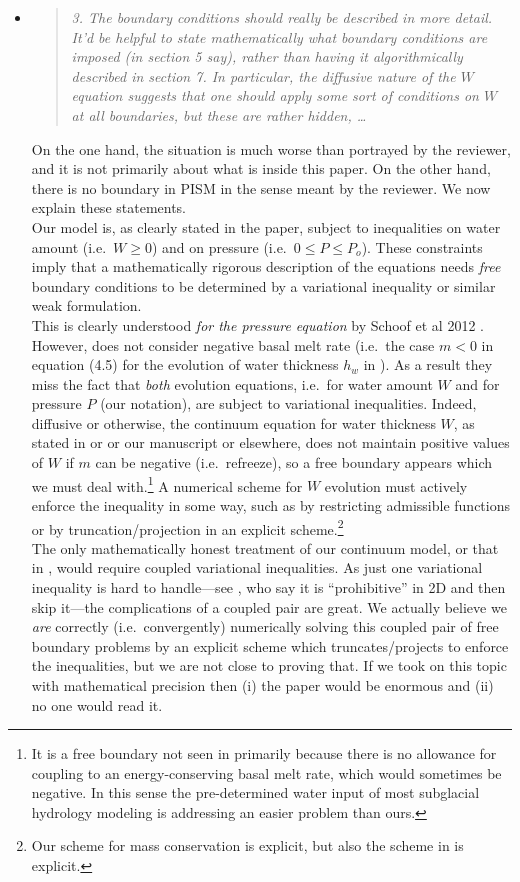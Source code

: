 \documentclass[11pt,reqno]{amsart}
\newcommand{\reply}[2]{
\medskip\medskip
\item  \begin{quote}
\emph{#1}
\end{quote}

\medskip
\noindent #2}
\begin{document}
\begin{itemize}
\reply{3. The boundary conditions should really be described in more detail.  It'd be helpful to state mathematically what boundary conditions are imposed (in section 5 say), rather than having it algorithmically described in section 7.  In particular, the diffusive nature of the $W$ equation suggests that one should apply some sort of conditions on $W$ at all boundaries, but these are rather hidden, \dots}
{On the one hand, the situation is much worse than portrayed by the reviewer, and it is not primarily about what is inside this paper.  On the other hand, there is no boundary in PISM in the sense meant by the reviewer.  We now explain these statements.\\
\indent Our model is, as clearly stated in the paper, subject to inequalities on water amount (i.e.~$W\ge 0$) and on pressure (i.e.~$0\le P \le P_o$).  These constraints imply that a mathematically rigorous description of the equations needs \emph{free} boundary conditions to be determined by a variational inequality or similar weak formulation.\\
\indent This is clearly understood \emph{for the pressure equation} by Schoof et al 2012 \cite{Schoofetal2012}.  However, \cite{Schoofetal2012} does not consider negative basal melt rate (i.e.~the case $m<0$ in equation (4.5) for the evolution of water thickness $h_w$ in \cite{Schoofetal2012}).  As a result they miss the fact that \emph{both} evolution equations, i.e.~for water amount $W$ and for pressure $P$ (our notation), are subject to variational inequalities.  Indeed, diffusive or otherwise, the continuum equation for water thickness $W$, as stated in \cite{Schoofetal2012} or \cite{Hewitt2011} or our manuscript or elsewhere, does not maintain positive values of $W$ if $m$ can be negative (i.e.~refreeze), so a free boundary appears which we must deal with.\footnote{It is a free boundary not seen in \cite{Schoofetal2012} primarily because there is no allowance for coupling to an energy-conserving basal melt rate, which would sometimes be negative.  In this sense the pre-determined water input of most subglacial hydrology modeling is addressing an easier problem than ours.}  A numerical scheme for $W$ evolution must actively enforce the inequality in some way, such as by restricting admissible functions or by truncation/projection in an explicit scheme.\footnote{Our scheme for mass conservation is explicit, but also the scheme in \cite{Schoofetal2012} is explicit.} \\
\indent The only mathematically honest treatment of our continuum model, or that in \cite{Schoofetal2012}, would require coupled variational inequalities.  As just one variational inequality is hard to handle---see \cite{Werderetal2013}, who say it is ``prohibitive'' in 2D and then skip it---the complications of a coupled pair are great.  We actually believe we \emph{are} correctly (i.e.~convergently) numerically solving this coupled pair of free boundary problems by an explicit scheme which truncates/projects to enforce the inequalities, but we are not close to proving that.  If we took on this topic with mathematical precision then (i) the paper would be enormous and (ii) no one would read it. \\
}
\end{itemize}
\end{document}
